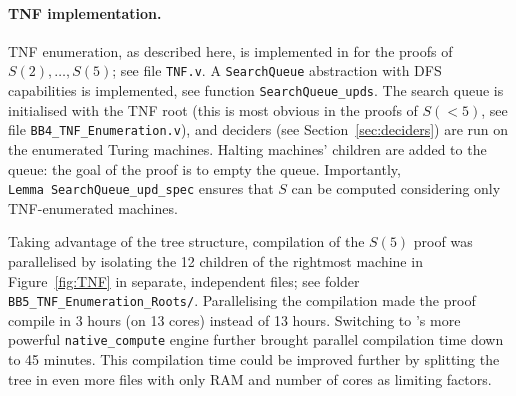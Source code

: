 
\paragraph{\CoqBB TNF implementation.} TNF enumeration, as described here, is implemented in \CoqBB for the proofs of $S(2),\dots,S(5)$; see file \texttt{TNF.v}. A \texttt{SearchQueue} abstraction with DFS capabilities is implemented, see function \texttt{SearchQueue\_upds}. The search queue is initialised with the TNF root (this is most obvious in the proofs of $S(<5)$, see file \texttt{BB4\_TNF\_Enumeration.v}), and deciders (see Section~\ref{sec:deciders}) are run on the enumerated Turing machines. Halting machines' children are added to the queue: the goal of the proof is to empty the queue. Importantly, \texttt{Lemma\ SearchQueue\_upd\_spec} ensures that $S$ can be computed considering only TNF-enumerated machines.

Taking advantage of the tree structure, compilation of the $S(5)$ proof was parallelised by isolating the 12 children of the rightmost machine in Figure~\ref{fig:TNF} in separate, independent files; see folder \texttt{BB5\_TNF\_Enumeration\_Roots/}. Parallelising the compilation made the proof compile in 3 hours (on 13 cores) instead of 13 hours. Switching to \Coq's more powerful \texttt{native\_compute} engine \cite{nativecompute} further brought parallel compilation time down to 45 minutes. This compilation time could be improved further by splitting the tree in even more files with only RAM and number of cores as limiting factors.


